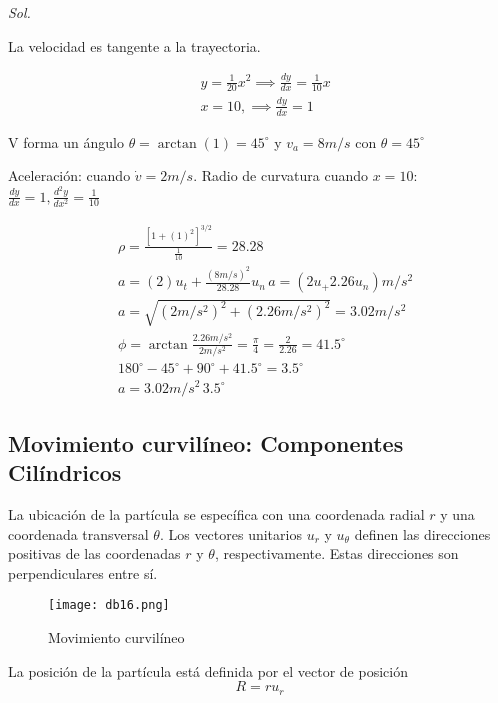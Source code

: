 \textit{ Sol. }

La velocidad es tangente a la trayectoria.

\begin{align*}
    &y=\frac{1}{20}x^2\implies \frac{dy}{dx}=\frac{1}{10}x\\
    &x=10,\implies \frac{dy}{dx}=1
\end{align*}

V forma un ángulo $\theta=\arctan{(1)}=45^{\circ}$ y $v_a=8m/s$ con $\theta=45^{\circ}$

Aceleración: cuando $\dot{v}=2m/s$. Radio de curvatura cuando $x=10$: $\frac{dy}{dx}=1,\frac{d^2y}{d x^2}=\frac{1}{10}$

\begin{align*}
    &\rho=\frac{\left[1+(1)^2\right]^{3/2}}{\frac{1}{10}}=28.28\\
    &a=(2)u_t+\frac{(8m/s)^2}{28.28}u_n\, a=(2u_+2.26u_n)m/s^2 \\ 
    &a=\sqrt{\left(2m/s^2\right)^2+\left(2.26m/s^2\right)^2}=3.02m/s^2\\
    &\phi=\arctan{\frac{2.26m/s^2}{2m/s^2}}=\frac{\pi}{4}=\frac{2}{2.26}=41.5^{\circ}\\
    &180^{\circ}- 45^{\circ} +90^{\circ}+41.5^{\circ}=3.5^{\circ}\\
    &a=3.02m/s^2\, 3.5^{\circ}
\end{align*}

\subsection{Movimiento curvilíneo: Componentes Cilíndricos}

\begin{definition}
    La ubicación de la partícula se específica con una coordenada radial $r$ y una coordenada transversal $\theta$. Los vectores unitarios $u_r$ y $u_{\theta}$ definen las direcciones positivas de las coordenadas $r$ y $\theta$, respectivamente. Estas direcciones son perpendiculares entre sí.
\end{definition}

\begin{figure}[h!]
  \centerline{\texttt{[image: db16.png]}}
  \caption{Movimiento curvilíneo}
  \label{db16}
\end{figure}

\begin{definition}[Posición]
    La posición de la partícula está definida por el vector de posición 
    \begin{equation}
        R=ru_r
    \end{equation}
\end{definition}

